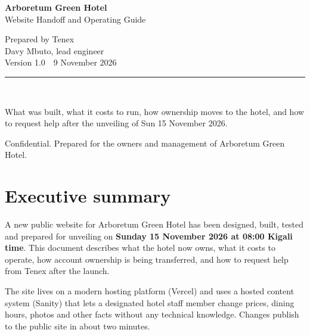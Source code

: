 \documentclass[11pt,a4paper]{article}
\begin{document}
\thispagestyle{empty}
\vspace*{3.5cm}

\begin{center}
\color{forest}
{\Huge\bfseries Arboretum Green Hotel}\\[0.4em]
{\LARGE Website Handoff and Operating Guide}

\vspace{2.4cm}

\color{ink}
{\large Prepared by Tenex}\\[0.3em]
{\normalsize Davy Mbuto, lead engineer}\\[1.2em]
{\normalsize Version 1.0 \,{\color{brass}\textbullet}\, 9 November 2026}

\vspace{3cm}

\color{ink600}
\rule{10cm}{0.3pt}\\[0.6em]
\parbox{11cm}{\centering\normalsize What was built, what it costs to run, how ownership moves to the hotel, and how to request help after the unveiling of Sun 15 November 2026.}
\end{center}

\vspace{\fill}

\begin{center}
\color{ink600}\small
Confidential. Prepared for the owners and management of Arboretum Green Hotel.
\end{center}

\newpage

\tableofcontents
\newpage

\section{Executive summary}

A new public website for Arboretum Green Hotel has been designed, built, tested and prepared for unveiling on \textbf{Sunday 15 November 2026 at 08:00 Kigali time}. This document describes what the hotel now owns, what it costs to operate, how account ownership is being transferred, and how to request help from Tenex after the launch.

The site lives on a modern hosting platform (Vercel) and uses a hosted content system (Sanity) that lets a designated hotel staff member change prices, dining hours, photos and other facts without any technical knowledge. Changes publish to the public site in about two minutes.
\end{document}
